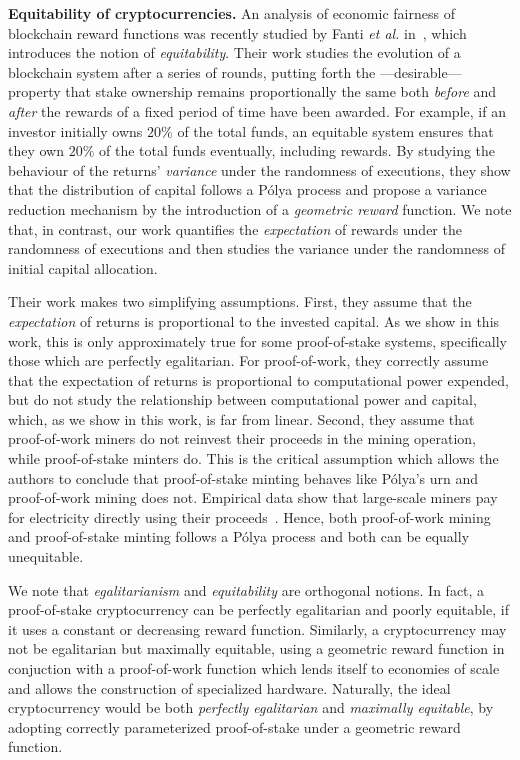 \noindent\textbf{Equitability of cryptocurrencies.}
An analysis of economic fairness of
blockchain reward functions was recently studied by Fanti \textit{et al.} in~\cite{equitability}, which
introduces the notion of \emph{equitability}. Their work studies the evolution
of a blockchain system after a series of rounds, putting forth the
---desirable--- property that stake ownership remains proportionally the same
both \emph{before} and \emph{after} the rewards of a fixed period of time have been awarded.
For example, if an
investor initially owns $20\%$ of the total funds, an equitable system ensures that they
own $20\%$ of the total funds eventually, \ie including
rewards. By studying the behaviour of the returns' \emph{variance} under the
randomness of executions, they show that the distribution of capital
follows a Pólya process and propose a variance reduction mechanism
by the introduction of a \emph{geometric reward} function.
We note that, in contrast, our work quantifies the \emph{expectation} of rewards
under the randomness of executions and then studies the variance under the
randomness of initial capital allocation.

Their work makes two simplifying assumptions.
First, they assume that the \emph{expectation} of returns is proportional to the
invested capital. As we show in this work, this is only
approximately true for some proof-of-stake systems, specifically those which are perfectly egalitarian. For proof-of-work, they
correctly assume that the expectation of returns is proportional to computational
power expended, but do not study the relationship between computational power and
capital, which, as we show in this work, is far from linear. Second, they assume that
proof-of-work miners do not reinvest their proceeds in the
mining operation, while proof-of-stake minters do. This is the critical assumption which allows the authors to
conclude that proof-of-stake minting behaves like Pólya's urn and
proof-of-work mining does not. Empirical data show that large-scale miners pay for electricity
directly using their proceeds~\cite{kharif2018}. Hence, both proof-of-work mining
and proof-of-stake minting follows a Pólya process and both can be equally unequitable.

We note that \emph{egalitarianism} and \emph{equitability} are orthogonal
notions. In fact, a proof-of-stake cryptocurrency can be perfectly egalitarian
and poorly equitable, \eg if it uses a constant or decreasing reward function.
Similarly, a cryptocurrency may not be egalitarian but maximally equitable, \eg
using a geometric reward function in conjuction with a proof-of-work function
which lends itself to economies of scale and allows the construction of
specialized hardware.
Naturally, the ideal cryptocurrency would be both
\emph{perfectly egalitarian} and \emph{maximally equitable}, \eg by adopting
correctly parameterized proof-of-stake under a geometric reward function.
